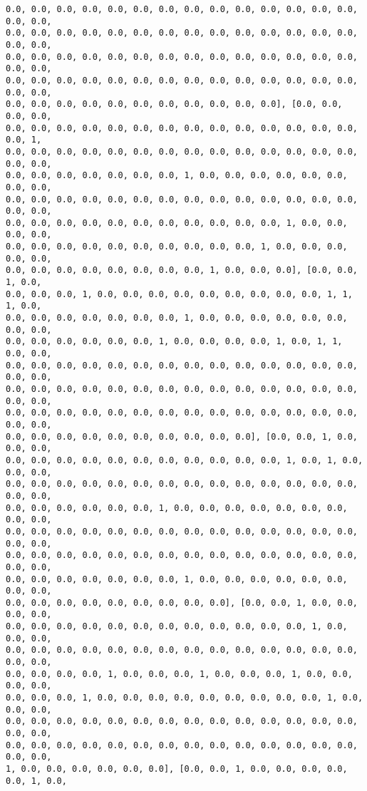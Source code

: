 \documentclass[11pt]{article}
\begin{document}
\begin{Verbatim}[commandchars=\\\{\}]
0.0, 0.0, 0.0, 0.0, 0.0, 0.0, 0.0, 0.0, 0.0, 0.0, 0.0, 0.0, 0.0, 0.0, 0.0, 0.0,
0.0, 0.0, 0.0, 0.0, 0.0, 0.0, 0.0, 0.0, 0.0, 0.0, 0.0, 0.0, 0.0, 0.0, 0.0, 0.0,
0.0, 0.0, 0.0, 0.0, 0.0, 0.0, 0.0, 0.0, 0.0, 0.0, 0.0, 0.0, 0.0, 0.0, 0.0, 0.0,
0.0, 0.0, 0.0, 0.0, 0.0, 0.0, 0.0, 0.0, 0.0, 0.0, 0.0, 0.0, 0.0, 0.0, 0.0, 0.0,
0.0, 0.0, 0.0, 0.0, 0.0, 0.0, 0.0, 0.0, 0.0, 0.0, 0.0], [0.0, 0.0, 0.0, 0.0,
0.0, 0.0, 0.0, 0.0, 0.0, 0.0, 0.0, 0.0, 0.0, 0.0, 0.0, 0.0, 0.0, 0.0, 0.0, 1,
0.0, 0.0, 0.0, 0.0, 0.0, 0.0, 0.0, 0.0, 0.0, 0.0, 0.0, 0.0, 0.0, 0.0, 0.0, 0.0,
0.0, 0.0, 0.0, 0.0, 0.0, 0.0, 0.0, 1, 0.0, 0.0, 0.0, 0.0, 0.0, 0.0, 0.0, 0.0,
0.0, 0.0, 0.0, 0.0, 0.0, 0.0, 0.0, 0.0, 0.0, 0.0, 0.0, 0.0, 0.0, 0.0, 0.0, 0.0,
0.0, 0.0, 0.0, 0.0, 0.0, 0.0, 0.0, 0.0, 0.0, 0.0, 0.0, 1, 0.0, 0.0, 0.0, 0.0,
0.0, 0.0, 0.0, 0.0, 0.0, 0.0, 0.0, 0.0, 0.0, 0.0, 1, 0.0, 0.0, 0.0, 0.0, 0.0,
0.0, 0.0, 0.0, 0.0, 0.0, 0.0, 0.0, 0.0, 1, 0.0, 0.0, 0.0], [0.0, 0.0, 1, 0.0,
0.0, 0.0, 0.0, 1, 0.0, 0.0, 0.0, 0.0, 0.0, 0.0, 0.0, 0.0, 0.0, 1, 1, 1, 0.0,
0.0, 0.0, 0.0, 0.0, 0.0, 0.0, 0.0, 1, 0.0, 0.0, 0.0, 0.0, 0.0, 0.0, 0.0, 0.0,
0.0, 0.0, 0.0, 0.0, 0.0, 0.0, 1, 0.0, 0.0, 0.0, 0.0, 1, 0.0, 1, 1, 0.0, 0.0,
0.0, 0.0, 0.0, 0.0, 0.0, 0.0, 0.0, 0.0, 0.0, 0.0, 0.0, 0.0, 0.0, 0.0, 0.0, 0.0,
0.0, 0.0, 0.0, 0.0, 0.0, 0.0, 0.0, 0.0, 0.0, 0.0, 0.0, 0.0, 0.0, 0.0, 0.0, 0.0,
0.0, 0.0, 0.0, 0.0, 0.0, 0.0, 0.0, 0.0, 0.0, 0.0, 0.0, 0.0, 0.0, 0.0, 0.0, 0.0,
0.0, 0.0, 0.0, 0.0, 0.0, 0.0, 0.0, 0.0, 0.0, 0.0], [0.0, 0.0, 1, 0.0, 0.0, 0.0,
0.0, 0.0, 0.0, 0.0, 0.0, 0.0, 0.0, 0.0, 0.0, 0.0, 0.0, 1, 0.0, 1, 0.0, 0.0, 0.0,
0.0, 0.0, 0.0, 0.0, 0.0, 0.0, 0.0, 0.0, 0.0, 0.0, 0.0, 0.0, 0.0, 0.0, 0.0, 0.0,
0.0, 0.0, 0.0, 0.0, 0.0, 0.0, 1, 0.0, 0.0, 0.0, 0.0, 0.0, 0.0, 0.0, 0.0, 0.0,
0.0, 0.0, 0.0, 0.0, 0.0, 0.0, 0.0, 0.0, 0.0, 0.0, 0.0, 0.0, 0.0, 0.0, 0.0, 0.0,
0.0, 0.0, 0.0, 0.0, 0.0, 0.0, 0.0, 0.0, 0.0, 0.0, 0.0, 0.0, 0.0, 0.0, 0.0, 0.0,
0.0, 0.0, 0.0, 0.0, 0.0, 0.0, 0.0, 1, 0.0, 0.0, 0.0, 0.0, 0.0, 0.0, 0.0, 0.0,
0.0, 0.0, 0.0, 0.0, 0.0, 0.0, 0.0, 0.0, 0.0], [0.0, 0.0, 1, 0.0, 0.0, 0.0, 0.0,
0.0, 0.0, 0.0, 0.0, 0.0, 0.0, 0.0, 0.0, 0.0, 0.0, 0.0, 0.0, 1, 0.0, 0.0, 0.0,
0.0, 0.0, 0.0, 0.0, 0.0, 0.0, 0.0, 0.0, 0.0, 0.0, 0.0, 0.0, 0.0, 0.0, 0.0, 0.0,
0.0, 0.0, 0.0, 0.0, 1, 0.0, 0.0, 0.0, 1, 0.0, 0.0, 0.0, 1, 0.0, 0.0, 0.0, 0.0,
0.0, 0.0, 0.0, 1, 0.0, 0.0, 0.0, 0.0, 0.0, 0.0, 0.0, 0.0, 0.0, 1, 0.0, 0.0, 0.0,
0.0, 0.0, 0.0, 0.0, 0.0, 0.0, 0.0, 0.0, 0.0, 0.0, 0.0, 0.0, 0.0, 0.0, 0.0, 0.0,
0.0, 0.0, 0.0, 0.0, 0.0, 0.0, 0.0, 0.0, 0.0, 0.0, 0.0, 0.0, 0.0, 0.0, 0.0, 0.0,
1, 0.0, 0.0, 0.0, 0.0, 0.0, 0.0], [0.0, 0.0, 1, 0.0, 0.0, 0.0, 0.0, 0.0, 1, 0.0,

\end{Verbatim}
\end{document}
